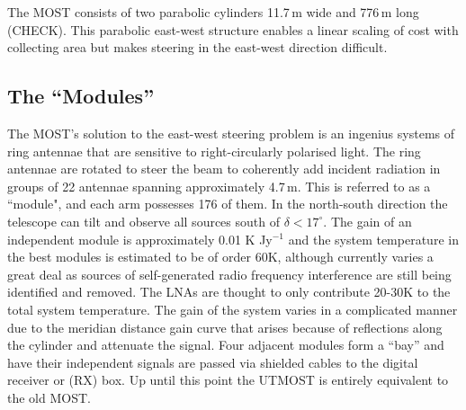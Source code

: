 
The MOST consists of two parabolic cylinders 11.7\,m wide and 776\,m long (CHECK). This parabolic east-west structure enables a linear scaling of cost with collecting area but makes steering in the east-west direction difficult.

\subsection{The ``Modules''}
The MOST's solution to the east-west steering problem is an ingenius systems of ring antennae that are sensitive to right-circularly polarised light. The ring antennae are rotated to steer the beam to coherently add incident radiation in groups of 22 antennae spanning approximately 4.7\,m. This is referred to as a ``module", and each arm possesses 176 of them. In the north-south direction the telescope can tilt and observe all sources south of $\delta<17^\circ$. The gain of an independent module is approximately 0.01 K Jy$^{-1}$ and the system temperature in the best modules is estimated to be of order 60K, although currently varies a great deal as sources of self-generated radio frequency interference are still being identified and removed. The LNAs are thought to only contribute 20-30K to the total system temperature.
The gain of the system varies in a complicated manner due to the meridian distance gain curve that arises because of reflections along the cylinder and attenuate the signal\cite{Hunstead_1996}.
Four adjacent modules form a ``bay'' and have their independent signals are passed via shielded cables to the digital receiver or (RX) box. Up until this point the UTMOST is entirely equivalent to the old MOST.
